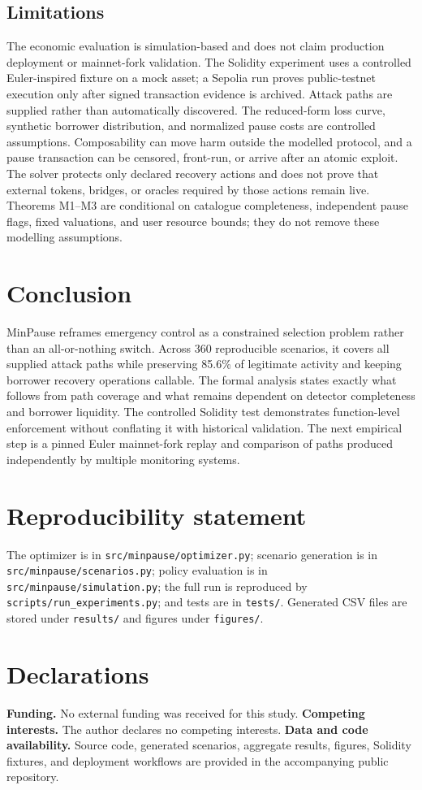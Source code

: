 \documentclass[sn-vancouver,Numbered]{sn-jnl}
\newcommand{\ScenarioCount}{360}
\newcommand{\MinAvailability}{85.6\%}
\begin{document}
\subsection{Limitations}
The economic evaluation is simulation-based and does not claim production deployment or mainnet-fork validation. The Solidity experiment uses a controlled Euler-inspired fixture on a mock asset; a Sepolia run proves public-testnet execution only after signed transaction evidence is archived. Attack paths are supplied rather than automatically discovered. The reduced-form loss curve, synthetic borrower distribution, and normalized pause costs are controlled assumptions. Composability can move harm outside the modelled protocol, and a pause transaction can be censored, front-run, or arrive after an atomic exploit. The solver protects only declared recovery actions and does not prove that external tokens, bridges, or oracles required by those actions remain live. Theorems M1--M3 are conditional on catalogue completeness, independent pause flags, fixed valuations, and user resource bounds; they do not remove these modelling assumptions.

\section{Conclusion}
MinPause reframes emergency control as a constrained selection problem rather than an all-or-nothing switch. Across \ScenarioCount{} reproducible scenarios, it covers all supplied attack paths while preserving \MinAvailability{} of legitimate activity and keeping borrower recovery operations callable. The formal analysis states exactly what follows from path coverage and what remains dependent on detector completeness and borrower liquidity. The controlled Solidity test demonstrates function-level enforcement without conflating it with historical validation. The next empirical step is a pinned Euler mainnet-fork replay and comparison of paths produced independently by multiple monitoring systems.

\section*{Reproducibility statement}
The optimizer is in \texttt{src/minpause/optimizer.py}; scenario generation is in \texttt{src/minpause/scenarios.py}; policy evaluation is in \texttt{src/minpause/simulation.py}; the full run is reproduced by \texttt{scripts/run\_experiments.py}; and tests are in \texttt{tests/}.  Generated CSV files are stored under \texttt{results/} and figures under \texttt{figures/}.

\section*{Declarations}
\textbf{Funding.} No external funding was received for this study. \textbf{Competing interests.} The author declares no competing interests. \textbf{Data and code availability.} Source code, generated scenarios, aggregate results, figures, Solidity fixtures, and deployment workflows are provided in the accompanying public repository.


\end{document}
